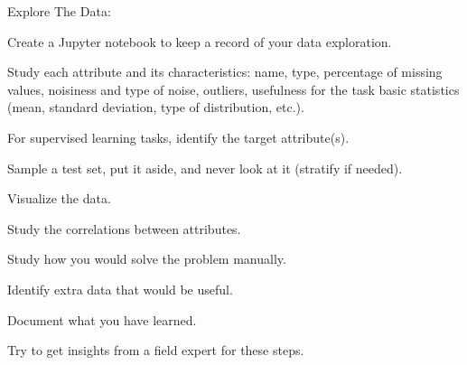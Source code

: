 Explore The Data:
\bit
\item Create a Jupyter notebook to keep a record of your data exploration.
\item Study each attribute and its characteristics: name, type, percentage of missing values, noisiness and type of
noise, outliers, usefulness for the task basic statistics (mean, standard deviation, type of distribution, etc.).
\item For supervised learning tasks, identify the target attribute(s).
\item Sample a test set, put it aside, and never look at it (stratify if needed).
\item Visualize the data.
\item Study the correlations between attributes.
\item Study how you would solve the problem manually.
\item Identify extra data that would be useful.
\item Document what you have learned.
\item Try to get insights from a field expert for these steps.
\eit

